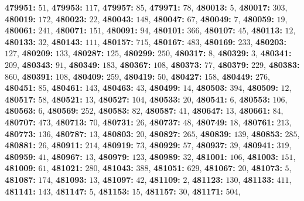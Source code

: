 \textsf{\bfseries 479951:} $51$, \textsf{\bfseries 479953:} $117$, \textsf{\bfseries 479957:} $85$, \textsf{\bfseries 479971:} $78$, \textsf{\bfseries 480013:} $5$, \textsf{\bfseries 480017:} $303$, \textsf{\bfseries 480019:} $172$, \textsf{\bfseries 480023:} $22$, \textsf{\bfseries 480043:} $148$, \textsf{\bfseries 480047:} $67$, \textsf{\bfseries 480049:} $7$, \textsf{\bfseries 480059:} $19$, \textsf{\bfseries 480061:} $241$, \textsf{\bfseries 480071:} $151$, \textsf{\bfseries 480091:} $94$, \textsf{\bfseries 480101:} $366$, \textsf{\bfseries 480107:} $45$, \textsf{\bfseries 480113:} $12$, \textsf{\bfseries 480133:} $32$, \textsf{\bfseries 480143:} $111$, \textsf{\bfseries 480157:} $715$, \textsf{\bfseries 480167:} $483$, \textsf{\bfseries 480169:} $233$, \textsf{\bfseries 480203:} $127$, \textsf{\bfseries 480209:} $133$, \textsf{\bfseries 480287:} $125$, \textsf{\bfseries 480299:} $250$, \textsf{\bfseries 480317:} $8$, \textsf{\bfseries 480329:} $3$, \textsf{\bfseries 480341:} $209$, \textsf{\bfseries 480343:} $91$, \textsf{\bfseries 480349:} $183$, \textsf{\bfseries 480367:} $108$, \textsf{\bfseries 480373:} $77$, \textsf{\bfseries 480379:} $229$, \textsf{\bfseries 480383:} $860$, \textsf{\bfseries 480391:} $108$, \textsf{\bfseries 480409:} $259$, \textsf{\bfseries 480419:} $50$, \textsf{\bfseries 480427:} $158$, \textsf{\bfseries 480449:} $276$, \textsf{\bfseries 480451:} $85$, \textsf{\bfseries 480461:} $143$, \textsf{\bfseries 480463:} $43$, \textsf{\bfseries 480499:} $14$, \textsf{\bfseries 480503:} $394$, \textsf{\bfseries 480509:} $12$, \textsf{\bfseries 480517:} $58$, \textsf{\bfseries 480521:} $13$, \textsf{\bfseries 480527:} $104$, \textsf{\bfseries 480533:} $20$, \textsf{\bfseries 480541:} $6$, \textsf{\bfseries 480553:} $106$, \textsf{\bfseries 480563:} $6$, \textsf{\bfseries 480569:} $252$, \textsf{\bfseries 480583:} $82$, \textsf{\bfseries 480587:} $41$, \textsf{\bfseries 480647:} $13$, \textsf{\bfseries 480661:} $84$, \textsf{\bfseries 480707:} $473$, \textsf{\bfseries 480713:} $70$, \textsf{\bfseries 480731:} $26$, \textsf{\bfseries 480737:} $48$, \textsf{\bfseries 480749:} $18$, \textsf{\bfseries 480761:} $213$, \textsf{\bfseries 480773:} $136$, \textsf{\bfseries 480787:} $13$, \textsf{\bfseries 480803:} $20$, \textsf{\bfseries 480827:} $265$, \textsf{\bfseries 480839:} $139$, \textsf{\bfseries 480853:} $285$, \textsf{\bfseries 480881:} $26$, \textsf{\bfseries 480911:} $214$, \textsf{\bfseries 480919:} $73$, \textsf{\bfseries 480929:} $57$, \textsf{\bfseries 480937:} $39$, \textsf{\bfseries 480941:} $319$, \textsf{\bfseries 480959:} $41$, \textsf{\bfseries 480967:} $13$, \textsf{\bfseries 480979:} $123$, \textsf{\bfseries 480989:} $32$, \textsf{\bfseries 481001:} $106$, \textsf{\bfseries 481003:} $151$, \textsf{\bfseries 481009:} $61$, \textsf{\bfseries 481021:} $280$, \textsf{\bfseries 481043:} $388$, \textsf{\bfseries 481051:} $629$, \textsf{\bfseries 481067:} $20$, \textsf{\bfseries 481073:} $5$, \textsf{\bfseries 481087:} $174$, \textsf{\bfseries 481093:} $13$, \textsf{\bfseries 481097:} $42$, \textsf{\bfseries 481109:} $2$, \textsf{\bfseries 481123:} $130$, \textsf{\bfseries 481133:} $411$, \textsf{\bfseries 481141:} $143$, \textsf{\bfseries 481147:} $5$, \textsf{\bfseries 481153:} $15$, \textsf{\bfseries 481157:} $30$, \textsf{\bfseries 481171:} $504$, 
